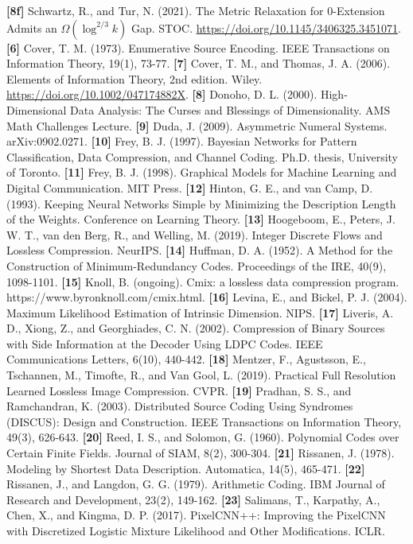 \documentclass[
]{article}
\begin{document}
\textbf{{[}8f{]}} Schwartz, R., and Tur, N. (2021). The
Metric Relaxation for $0$-Extension Admits an $\Omega(\log^{2/3} k)$ Gap.
STOC. \url{https://doi.org/10.1145/3406325.3451071}.
\textbf{{[}6{]}} Cover, T. M. (1973). Enumerative Source Encoding. IEEE
Transactions on Information Theory, 19(1), 73-77.
\textbf{{[}7{]}} Cover, T. M., and
Thomas, J. A. (2006). Elements of Information Theory, 2nd edition. Wiley.
\url{https://doi.org/10.1002/047174882X}.
\textbf{{[}8{]}} Donoho, D. L. (2000). High-Dimensional Data Analysis:
The Curses and Blessings of Dimensionality. AMS Math Challenges Lecture.
\textbf{{[}9{]}} Duda, J. (2009). Asymmetric Numeral Systems.
arXiv:0902.0271.
\textbf{{[}10{]}} Frey, B. J. (1997). Bayesian Networks for Pattern
Classification, Data Compression, and Channel Coding. Ph.D. thesis,
University of Toronto.
\textbf{{[}11{]}} Frey, B. J. (1998). Graphical Models for Machine
Learning and Digital Communication. MIT Press.
\textbf{{[}12{]}} Hinton, G. E., and van Camp, D. (1993). Keeping Neural
Networks Simple by Minimizing the Description Length of the Weights.
Conference on Learning Theory.
\textbf{{[}13{]}} Hoogeboom, E., Peters, J. W. T., van den Berg, R., and
Welling, M. (2019). Integer Discrete Flows and Lossless Compression.
NeurIPS.
\textbf{{[}14{]}} Huffman, D. A. (1952). A Method for the Construction
of Minimum-Redundancy Codes. Proceedings of the IRE, 40(9), 1098-1101.
\textbf{{[}15{]}} Knoll, B. (ongoing). Cmix: a lossless data compression
program. https://www.byronknoll.com/cmix.html.
\textbf{{[}16{]}} Levina, E., and Bickel, P. J. (2004). Maximum
Likelihood Estimation of Intrinsic Dimension. NIPS.
\textbf{{[}17{]}} Liveris, A. D., Xiong, Z., and Georghiades, C. N.
(2002). Compression of Binary Sources with Side Information at the
Decoder Using LDPC Codes. IEEE Communications Letters, 6(10), 440-442.
\textbf{{[}18{]}} Mentzer, F., Agustsson, E., Tschannen, M., Timofte,
R., and Van Gool, L. (2019). Practical Full Resolution Learned Lossless
Image Compression. CVPR.
\textbf{{[}19{]}} Pradhan, S. S., and Ramchandran, K. (2003).
Distributed Source Coding Using Syndromes (DISCUS): Design and
Construction. IEEE Transactions on Information Theory, 49(3), 626-643.
\textbf{{[}20{]}} Reed, I. S., and Solomon, G. (1960). Polynomial Codes
over Certain Finite Fields. Journal of SIAM, 8(2), 300-304.
\textbf{{[}21{]}} Rissanen, J. (1978). Modeling by Shortest Data
Description. Automatica, 14(5), 465-471.
\textbf{{[}22{]}} Rissanen, J., and Langdon, G. G. (1979). Arithmetic
Coding. IBM Journal of Research and Development, 23(2), 149-162.
\textbf{{[}23{]}} Salimans, T., Karpathy, A., Chen, X., and Kingma, D.
P. (2017). PixelCNN++: Improving the PixelCNN with Discretized Logistic
Mixture Likelihood and Other Modifications. ICLR.
\end{document}
